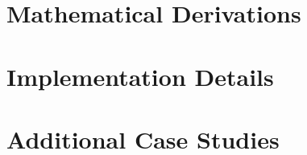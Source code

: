 \documentclass{article}
\begin{document}
\appendix
\section{Mathematical Derivations}
\section{Implementation Details}
\section{Additional Case Studies}
\end{document}
